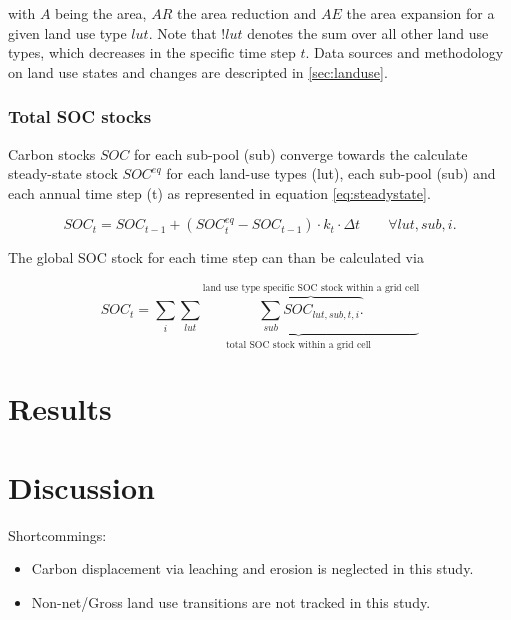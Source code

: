 \documentclass[gc, manuscript]{copernicus}
\begin{document}
with \(A\) being the area, \(AR\) the area reduction and \(AE\) the area expansion for a given land use type \(lut\). Note that \(!lut\) denotes the sum over all other land use types, which decreases in the specific time step \(t\). Data sources and methodology on land use states and changes are descripted in \ref{sec:landuse}.

\hypertarget{total-soc-stocks}{%
\subsubsection{Total SOC stocks}\label{total-soc-stocks}}

Carbon stocks \(SOC\) for each sub-pool (sub) converge towards the calculate steady-state stock \(SOC^{eq}\) for each land-use types (lut), each sub-pool (sub) and each annual time step (t) as represented in equation \eqref{eq:steadystate}.

\begin{equation}
SOC_{t} = SOC_{t-1} + (SOC^{eq}_{t} - SOC_{t-1}) \cdot k_{t} \cdot \Delta t \qquad \forall lut, sub, i.
\label{eq:steadystate}
\end{equation}

The global SOC stock for each time step can than be calculated via

\begin{equation}
SOC_{t} = \sum_{i} \underbrace{\sum_{lut} \overbrace{\sum_{sub} SOC_{lut, sub, t, i}.}^{\text{land use type specific SOC stock within a grid cell}}}_{\text{total SOC stock within a grid cell}}
\label{eq:totalstock}
\end{equation}

\newpage

\newpage

\hypertarget{results}{%
\section{Results}\label{results}}

\newpage

\hypertarget{discussion}{%
\section{Discussion}\label{discussion}}

Shortcommings:

\begin{itemize}
\item
  Carbon displacement via leaching and erosion is neglected in this study.
\item
  Non-net/Gross land use transitions are not tracked in this study.
  \newpage
\end{itemize}
\end{document}
